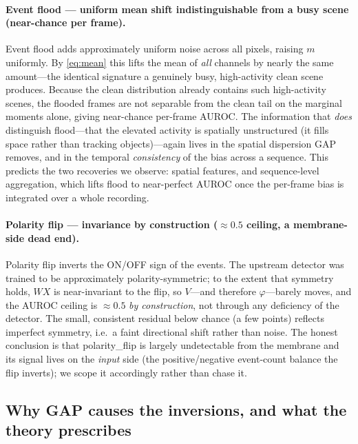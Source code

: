 \paragraph{Event flood --- uniform mean shift indistinguishable from a busy scene
(near-chance per frame).}
Event flood adds approximately uniform noise across all pixels, raising $m$ uniformly. By
\eqref{eq:mean} this lifts the mean of \emph{all} channels by nearly the same amount---the
identical signature a genuinely busy, high-activity clean scene produces. Because the clean
distribution already contains such high-activity scenes, the flooded frames are not separable
from the clean tail on the marginal moments alone, giving near-chance per-frame AUROC. The
information that \emph{does} distinguish flood---that the elevated activity is spatially
unstructured (it fills space rather than tracking objects)---again lives in the spatial
dispersion GAP removes, and in the temporal \emph{consistency} of the bias across a sequence.
This predicts the two recoveries we observe: spatial features, and sequence-level
aggregation, which lifts flood to near-perfect AUROC once the per-frame bias is integrated
over a whole recording.

\paragraph{Polarity flip --- invariance by construction ($\approx 0.5$ ceiling, a
membrane-side dead end).}
Polarity flip inverts the ON/OFF sign of the events. The upstream detector was trained to be
approximately polarity-symmetric; to the extent that symmetry holds, $W X$ is near-invariant
to the flip, so $V$---and therefore $\varphi$---barely moves, and the AUROC ceiling is
$\approx 0.5$ \emph{by construction}, not through any deficiency of the detector. The small,
consistent residual below chance (a few points) reflects imperfect symmetry, i.e.\ a faint
directional shift rather than noise. The honest conclusion is that polarity\_flip is largely
undetectable from the membrane and its signal lives on the \emph{input} side (the
positive/negative event-count balance the flip inverts); we scope it accordingly rather than
chase it.

\subsection{Why GAP causes the inversions, and what the theory prescribes}
\label{sec:theory-taxonomy}

